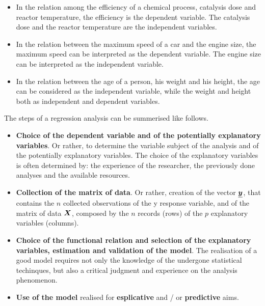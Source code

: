 \begin{frame}
  \begin{itemize}
    \item In the relation among the efficiency of a chemical process, catalysis dose and reactor temperature, the efficiency is the dependent variable. The catalysis dose and the reactor temperature are the independent variables.
    \vspace*{.15cm}
    \item In the relation between the maximum speed of a car and the engine size, the maximum speed can be interpreted as the dependent variable. The engine size can be interpreted as the independent variable.
    \vspace*{.15cm}
    \item In the relation between the age of a person, his weight and his height, the age can be considered as  the independent variable, while the weight and height both as independent and dependent variables.
  \end{itemize}
\end{frame}


\begin{frame}
  \begin{small}
  The steps of a regression analysis can be summerised like follows.
  \begin{itemize}
    \vspace{-0.05cm}
    \item \textbf{Choice of the dependent variable and of the potentially explanatory variables}. Or rather, to determine the variable subject of the analysis and of the potentially explanatory variables. The choice of the explanatory variables is often determined by: the experience of the researcher, the previously done analyses and the available resources. 
    \vspace{-0.05cm}
    \item \textbf{Collection of the matrix of data}. Or rather, creation of the vector $ \boldsymbol{\underline{y}} $, that contains the $ n $ collected observations of the y response variable, and of the matrix of data $ \boldsymbol{X} $, composed by the $ n $ records (rows) of the $ p $ explanatory variables (columns).
    \vspace{-0.05cm}
    \item \textbf{Choice of the functional relation and selection of the explanatory variables, estimation and validation of the model}. The realisation of a good model requires not only the knowledge of the undergone statistical techinques, but also a critical judgment and experience on the analysis phenomenon.
    \vspace{-0.05cm}
    \item \textbf{Use of the model} realised for \textbf{esplicative} and / or \textbf{predictive} aims.
  \end{itemize}
  \end{small}
\end{frame}

